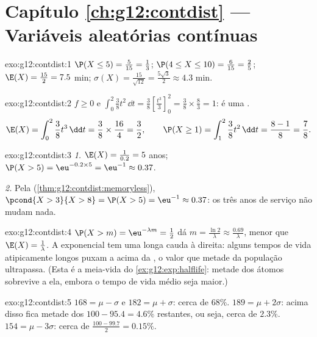 \section*{Capítulo \ref{ch:g12:contdist} --- Variáveis aleatórias contínuas}

\begin{solution}{exo:g12:contdist:1}
$\P(X \leq 5) = \frac{5}{15} = \frac13$;
$\P(4 \leq X \leq 10) = \frac{6}{15} = \frac25$;
$\E(X) = \frac{15}{2} = 7.5$ min;
$\sigma(X) = \frac{15}{\sqrt{12}} = \frac{5\sqrt3}{2} \approx 4.3$ min.
\end{solution}

\begin{solution}{exo:g12:contdist:2}
$f \geq 0$ e
$\int_0^2 \frac38 t^2\,\dd t = \frac38\left[\frac{t^3}{3}\right]_0^2
= \frac38 \times \frac83 = 1$: é uma .
\[
\E(X) = \int_0^2 \frac38 t^3\,\dd t = \frac38 \times \frac{16}{4} = \frac32,
\qquad
\P(X \geq 1) = \int_1^2 \frac38 t^2\,\dd t = \frac{8 - 1}{8} = \frac78 .
\]
\end{solution}

\begin{solution}{exo:g12:contdist:3}
\emph{1.} $\E(X) = \frac{1}{0.2} = 5$ anos;
$\P(X > 5) = \eu^{-0.2\times5} = \eu^{-1} \approx 0.37$.

\emph{2.} Pela 
(\cref{thm:g12:contdist:memoryless}),
$\pcond{X > 3}{X > 8} = \P(X > 5) = \eu^{-1} \approx 0.37$: os três anos
de serviço não mudam nada.
\end{solution}

\begin{solution}{exo:g12:contdist:4}
$\P(X > m) = \eu^{-\lambda m} = \frac12$ dá
$m = \frac{\ln 2}{\lambda} \approx \frac{0.69}{\lambda}$, menor que
$\E(X) = \frac1\lambda$. A  exponencial tem uma longa cauda à
direita: alguns tempos de vida atipicamente longos puxam a \emph{}
acima da \emph{}, o valor que metade da população ultrapassa. (Esta
é a meia-vida do \cref{ex:g12:exp:halflife}: metade dos átomos sobrevive a
ela, embora o tempo de vida médio seja maior.)
\end{solution}

\begin{solution}{exo:g12:contdist:5}
$168 = \mu - \sigma$ e $182 = \mu + \sigma$: cerca de $68\%$.
$189 = \mu + 2\sigma$: acima disso fica metade dos
$100 - 95.4 = 4.6\%$ restantes, ou seja, cerca de $2.3\%$.
$154 = \mu - 3\sigma$: cerca de $\frac{100 - 99.7}{2} = 0.15\%$.
\end{solution}

